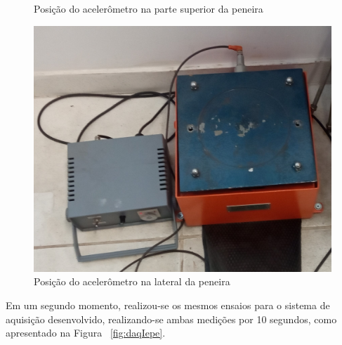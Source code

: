 \documentclass[
	12pt,				%
	openright,			%
	twoside,			%
	a4paper,			%
	english,			%
	french,				%
	spanish,			%
	brazil,				%
	]{abntex2}
\begin{document}
\begin{figure}[!ht]
\begin{minipage}{0.4\linewidth}
				\caption{Posição do acelerômetro na parte superior da peneira}
				\label{fig:accNaVertical}
			\end{minipage}
			\hfill\vline\hfill
			\begin{minipage}{0.4\linewidth}
				\centering
				\includegraphics[width = \linewidth]{../Fotos/peneiraAccLateral.jpg}
				\caption{Posição do acelerômetro na lateral da peneira}
				\label{fig:accNaLateral}
			\end{minipage}
		\end{figure}

		Em um segundo momento, realizou-se os mesmos ensaios para o sistema de aquisição desenvolvido, realizando-se ambas medições por 10 segundos, como apresentado na Figura ~\ref{fig:daqIepe}.
\end{document}
